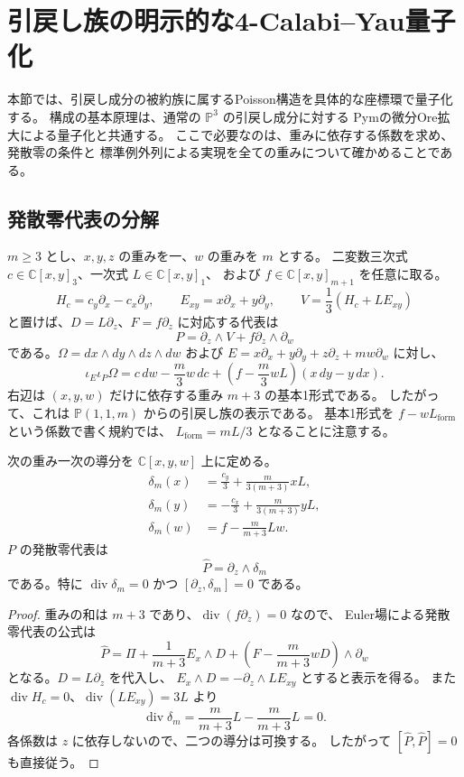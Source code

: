 \section{引戻し族の明示的な4-Calabi--Yau量子化}
\label{sec:pullback-ore-v33}

本節では、引戻し成分の被約族に属するPoisson構造を具体的な座標環で量子化する。
構成の基本原理は、通常の $\mathbb P^3$ の引戻し成分に対する
Pymの微分Ore拡大による量子化\cite[\S3.5]{Pym}と共通する。
ここで必要なのは、重みに依存する係数を求め、発散零の条件と
標準例外列による実現を全ての重みについて確かめることである。

\subsection{発散零代表の分解}

$m\ge3$ とし、$x,y,z$ の重みを一、$w$ の重みを $m$ とする。
二変数三次式 $c\in\mathbb C[x,y]_3$、一次式 $L\in\mathbb C[x,y]_1$、
および $f\in\mathbb C[x,y]_{m+1}$ を任意に取る。
\[
 H_c=c_y\partial_x-c_x\partial_y,\qquad
 E_{xy}=x\partial_x+y\partial_y,\qquad
 V=\frac13(H_c+LE_{xy})
\]
と置けば、$D=L\partial_z$、$F=f\partial_z$ に対応する代表は
\[
 P=\partial_z\wedge V+f\partial_z\wedge\partial_w
\]
である。$\Omega=dx\wedge dy\wedge dz\wedge dw$ および
$E=x\partial_x+y\partial_y+z\partial_z+mw\partial_w$ に対し、
\[
 \iota_E\iota_P\Omega
 =c\,dw-\frac m3 w\,dc+
       \left(f-\frac m3wL\right)(x\,dy-y\,dx).
\]
右辺は $(x,y,w)$ だけに依存する重み $m+3$ の基本1形式である。
したがって、これは $\mathbb P(1,1,m)$ からの引戻し族の表示である。
基本1形式を $f-wL_{\mathrm{form}}$ という係数で書く規約では、
$L_{\mathrm{form}}=mL/3$ となることに注意する。

\begin{lemma}
\label{lem:pullback-unimodular-v33}
次の重み一次の導分を $\mathbb C[x,y,w]$ 上に定める。
\begin{align*}
 \delta_m(x)&=\frac{c_y}{3}+\frac{m}{3(m+3)}xL,\\
 \delta_m(y)&=-\frac{c_x}{3}+\frac{m}{3(m+3)}yL,\\
 \delta_m(w)&=f-\frac{m}{m+3}Lw.
\end{align*}
$P$ の発散零代表は
\[
 \widehat P=\partial_z\wedge\delta_m
\]
である。特に $\operatorname{div}\delta_m=0$ かつ
$[\partial_z,\delta_m]=0$ である。
\end{lemma}

\begin{proof}
重みの和は $m+3$ であり、$\operatorname{div}(f\partial_z)=0$ なので、
Euler場による発散零代表の公式は
\[
 \widehat P=\Pi+\frac1{m+3}E_x\wedge D+
 \left(F-\frac m{m+3}wD\right)\wedge\partial_w
\]
となる。$D=L\partial_z$ を代入し、
$E_x\wedge D=-\partial_z\wedge LE_{xy}$ とすると表示を得る。
また $\operatorname{div}H_c=0$、$\operatorname{div}(LE_{xy})=3L$ より
\[
 \operatorname{div}\delta_m
 =\frac{m}{m+3}L-\frac{m}{m+3}L=0.
\]
各係数は $z$ に依存しないので、二つの導分は可換する。
したがって $[\widehat P,\widehat P]=0$ も直接従う。
\end{proof}

